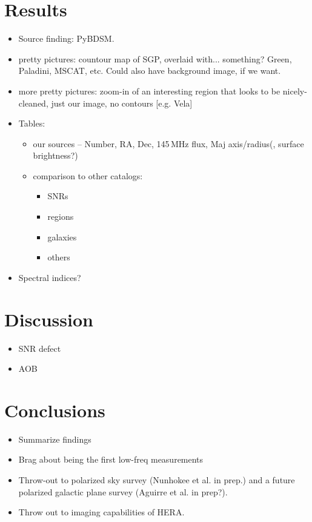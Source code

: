 \documentclass[preprint2,epsf,epsfig,graphics]{emulateapj}
\begin{document}
\section{Results}
\label{sec:res}

\begin{itemize}
\item Source finding: PyBDSM.
\item pretty pictures: countour map of SGP, overlaid with... something? Green, Paladini, MSCAT, etc. Could also have background image, if we want.
\item more pretty pictures: zoom-in of an interesting region that looks to be nicely-cleaned, just our image, no contours [e.g. Vela]
\item Tables: 
	\begin{itemize}
	\item our sources -- Number, RA, Dec, 145\,MHz flux, Maj axis/radius(, surface brightness?)
	\item comparison to other catalogs:
		\begin{itemize}
		\item SNRs
		\item {} regions
		\item galaxies
		\item others
		\end{itemize}
	\end{itemize}	
\item Spectral indices?
\end{itemize}


\section{Discussion}
\label{sec:disc}

\begin{itemize}
\item SNR defect
\item AOB
\end{itemize}

\section{Conclusions}
\label{sec:conc}

\begin{itemize}
\item Summarize findings
\item Brag about being the first low-freq measurements
\item Throw-out to polarized sky survey (Nunhokee et al. in prep.) and a future polarized galactic plane survey (Aguirre et al. in prep?).
\item Throw out to imaging capabilities of HERA.
\end{itemize}


{}
\end{document}
